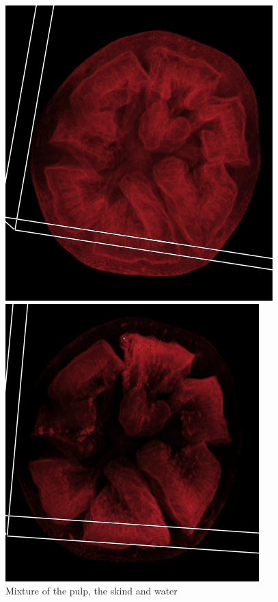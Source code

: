 \documentclass[a4paper,twoside,11pt]{article}
\begin{document}
 \begin{figure}[htb]
  \includegraphics[width=\linewidth]{images/tomatoOp}
  \caption{Mixture of the pulp, the skind and water}\label{tomatoOp}
\endminipage\hfill
{}
  \includegraphics[width=\linewidth]{images/tomatoOp2}

\end{figure}
\end{document}
